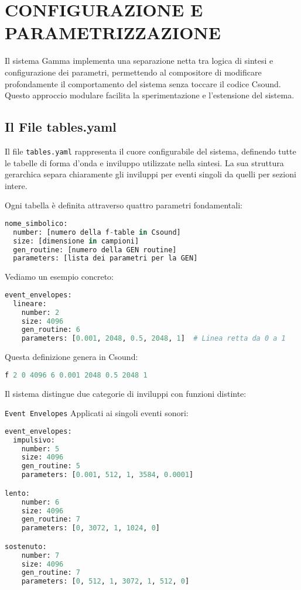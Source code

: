 
\section{CONFIGURAZIONE E PARAMETRIZZAZIONE}
Il sistema Gamma implementa una separazione netta tra logica di sintesi e configurazione dei parametri, permettendo al compositore di modificare profondamente il comportamento del sistema senza toccare il codice Csound. Questo approccio modulare facilita la sperimentazione e l'estensione del sistema.
\subsection{Il File tables.yaml}
Il file \texttt{tables.yaml} rappresenta il cuore configurabile del sistema, definendo tutte le tabelle di forma d'onda e inviluppo utilizzate nella sintesi. La sua struttura gerarchica separa chiaramente gli inviluppi per eventi singoli da quelli per sezioni intere.

Ogni tabella è definita attraverso quattro parametri fondamentali:

\begin{lstlisting}[language=Python]
nome_simbolico:
  number: [numero della f-table in Csound]
  size: [dimensione in campioni]
  gen_routine: [numero della GEN routine]
  parameters: [lista dei parametri per la GEN]
\end{lstlisting}

Vediamo un esempio concreto:

\begin{lstlisting}[language=Python]
event_envelopes:
  lineare:
    number: 2
    size: 4096
    gen_routine: 6
    parameters: [0.001, 2048, 0.5, 2048, 1]  # Linea retta da 0 a 1
\end{lstlisting}

Questa definizione genera in Csound:
\begin{lstlisting}[language=C]
f 2 0 4096 6 0.001 2048 0.5 2048 1
\end{lstlisting}

Il sistema distingue due categorie di inviluppi con funzioni distinte:

\texttt{Event Envelopes} Applicati ai singoli eventi sonori:

\begin{lstlisting}[language=Python]
event_envelopes:
  impulsivo:
    number: 5
    size: 4096
    gen_routine: 5
    parameters: [0.001, 512, 1, 3584, 0.0001]

lento:
    number: 6
    size: 4096
    gen_routine: 7
    parameters: [0, 3072, 1, 1024, 0]

sostenuto:
    number: 7
    size: 4096
    gen_routine: 7
    parameters: [0, 512, 1, 3072, 1, 512, 0]
\end{lstlisting}

